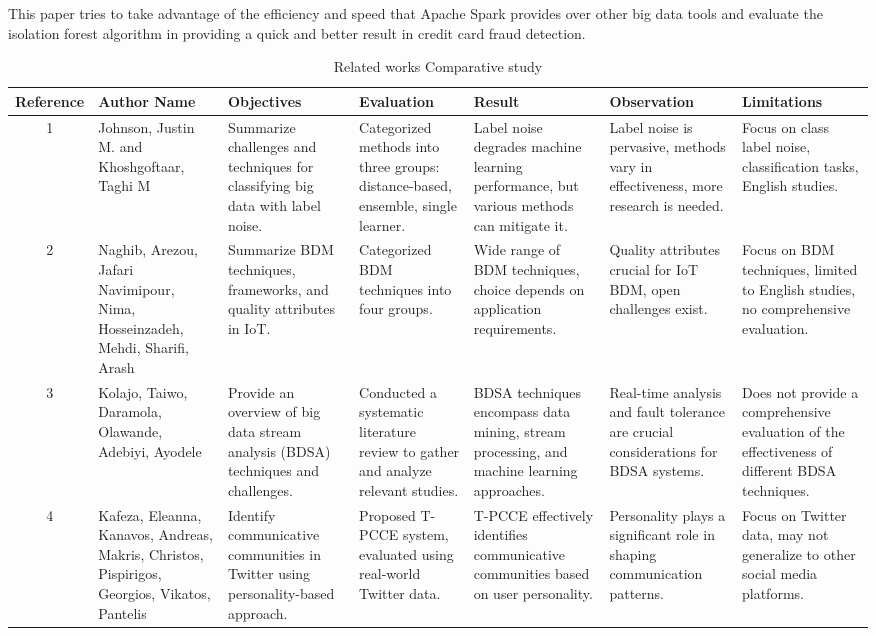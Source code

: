 \documentclass[journal]{IEEEtran}
\begin{document}
This paper tries to take advantage of the efficiency and speed that Apache Spark provides over other big data tools and evaluate the isolation forest algorithm in providing a quick and better result in credit card fraud detection.
\begin{table}[btp]
\caption{Related works Comparative study}
    \centering
    \begin{tabular}{|c|p{1.7cm}|p{3.4cm}|p{2.2cm}|p{2.2cm}|p{2.2cm}|p{2.2cm}|}
        \hline
        \textbf{Reference} & \textbf{Author Name} & \textbf{Objectives} & \textbf{Evaluation} & \textbf{Result} & \textbf{Observation} & \textbf{Limitations} \\
        \hline
        1 & Johnson, Justin M. and Khoshgoftaar, Taghi M & Summarize challenges and techniques for classifying big data with label noise. & Categorized methods into three groups: distance-based, ensemble, single learner. & Label noise degrades machine learning performance, but various methods can mitigate it. & Label noise is pervasive, methods vary in effectiveness, more research is needed. & Focus on class label noise, classification tasks, English studies. \\
        \hline
        2 & Naghib, Arezou, Jafari Navimipour, Nima, Hosseinzadeh, Mehdi, Sharifi, Arash & Summarize BDM techniques, frameworks, and quality attributes in IoT. & Categorized BDM techniques into four groups. & Wide range of BDM techniques, choice depends on application requirements. & Quality attributes crucial for IoT BDM, open challenges exist. & Focus on BDM techniques, limited to English studies, no comprehensive evaluation. \\
        \hline
        3 & Kolajo, Taiwo, Daramola, Olawande, Adebiyi, Ayodele & Provide an overview of big data stream analysis (BDSA) techniques and challenges. & Conducted a systematic literature review to gather and analyze relevant studies. & BDSA techniques encompass data mining, stream processing, and machine learning approaches. & Real-time analysis and fault tolerance are crucial considerations for BDSA systems. & Does not provide a comprehensive evaluation of the effectiveness of different BDSA techniques. \\
        \hline
        4 & Kafeza, Eleanna, Kanavos, Andreas, Makris, Christos, Pispirigos, Georgios, Vikatos, Pantelis & Identify communicative communities in Twitter using personality-based approach. & Proposed T-PCCE system, evaluated using real-world Twitter data. & T-PCCE effectively identifies communicative communities based on user personality. & Personality plays a significant role in shaping communication patterns. & Focus on Twitter data, may not generalize to other social media platforms. \\

\end{tabular}
\end{table}
\end{document}
